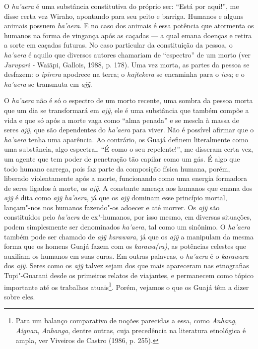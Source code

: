 O \emph{ha'aera} é uma substância constitutiva do próprio ser: ``Está por
aqui!'', me disse certa vez Wiraho, apontando para seu peito e barriga.
Humanos e alguns animais possuem \emph{ha'aera}. E no caso dos animais é
essa potência que atormenta os humanos na forma de vingança após as
caçadas --- a qual emana doenças e retira a sorte em caçadas futuras. No
caso particular da constituição da pessoa, o \emph{ha'aera} é aquilo que
diversos autores chamariam de ``espectro'' de um morto (ver \emph{Jurupari
-} Waiãpi, Gallois, 1988, p. 178). Uma vez morta, as partes da pessoa se
desfazem: o \emph{ipirera} apodrece na terra; o \emph{hajtekera} se
encaminha para o \emph{iwa}; e o \emph{ha'aera} se transmuta em
\emph{ajỹ}.

O \emph{ha'aera} não é só o espectro de um morto recente, uma sombra da
pessoa morta que um dia se transformará em \emph{ajỹ}, ele é uma
substância que também compõe a vida e que só após a morte vaga como
``alma penada'' e se mescla à massa de seres \emph{ajỹ}, que são
dependentes do \emph{ha'aera} para viver. Não é possível afirmar que o
\emph{ha'aera} tenha uma aparência. Ao contrário, os Guajá definem
literalmente como uma substância, algo espectral. ``É como o seu
repelente!'', me disseram certa vez, um agente que tem poder de
penetração tão capilar como um gás. É algo que todo humano carrega, pois
faz parte da composição física humana, porém, liberado violentamente
após a morte, funcionando como uma energia formadora de seres ligados à
morte, os \emph{ajỹ}. A constante ameaça aos humanos que emana dos
\emph{ajỹ} é dita como \emph{ajỹ} \emph{ha'aera}, já que os \emph{ajỹ}
dominam esse princípio mortal, lançam"-nos nos humanos fazendo"-os adoecer
e até morrer. Os \emph{ajỹ} são constituídos pelo \emph{ha'aera} de
ex"-humanos, por isso mesmo, em diversas situações, podem simplesmente
ser denominados \emph{ha'aera}, tal como um sinônimo. O \emph{ha'aera}
também pode ser chamado de \emph{ajỹ karawara}, já que os \emph{ajỹ} a
manipulam da mesma forma que os homens Guajá fazem com os
\emph{karawa(ra)}, as potências celestes que auxiliam os humanos em suas
curas. Em outras palavras, o \emph{ha'aera} é o \emph{karawara} dos
\emph{ajỹ}. Seres como os \emph{ajỹ} talvez sejam dos que mais
apareceram nas etnografias Tupi"-Guarani desde os primeiros relatos de
viajantes, e permanecem como tópico importante até os trabalhos
atuais\footnote{Para um balanço comparativo de noções parecidas a essa,
  como \emph{Anhang}, \emph{Aignan}, \emph{Anhanga}, dentre outras, cuja
  precedência na literatura etnológica é ampla, ver Viveiros de Castro
  (1986, p. 255).}. Porém, vejamos o que os Guajá têm a dizer sobre
eles.

